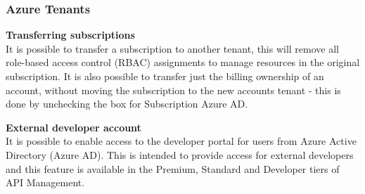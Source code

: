 \subsubsection{Azure Tenants}
\textbf{Transferring subscriptions} \\
It is possible to transfer a subscription to another tenant, this will remove all role-based access control (RBAC) assignments to manage resources in the original subscription. It is also possible to transfer just the billing ownership of an account, without moving the subscription to the new accounts tenant - this is done by unchecking the box for Subscription Azure AD.

\textbf{External developer account} \\
It is possible to enable access to the developer portal for users from Azure Active Directory (Azure AD). This is intended to provide access for external developers and this feature is available in the Premium, Standard and Developer tiers of API Management.


